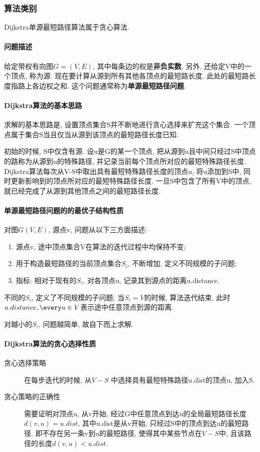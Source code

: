 \subsubsection{算法类别}
Dijkstra单源最短路径算法属于贪心算法.

\paragraph{问题描述}
给定带权有向图$G=(V,E)$, 其中每条边的权是\textbf{非负实数}. 另外, 还给定V中的一个顶点,
称为源. 现在要计算从源到所有其他各顶点的最短路长度.
此处的最短路长度指路上各边权之和. 这个问题通常称为\textbf{单源最短路径问题}.

\paragraph{Dijkstra算法的基本思路}
求解的基本思路是, 设置顶点集合S并不断地进行贪心选择来扩充这个集合.
一个顶点属于集合S当且仅当从源到该顶点的最短路径长度已知.\par

初始的时候, S中仅含有源. 设u是G的某一个顶点,
把从源到u且中间只经过S中顶点的路称为从源到u的特殊路径,
并记录当前每个顶点所对应的最短特殊路径长度.
Dijkstra算法每次从V-S中取出具有最短特殊路径长度的顶点u, 将u添加到S中,
同时更新影响到的顶点所对应的最短特殊路径长度. 一旦S中包含了所有V中的顶点,
就已经完成了从源到其他顶点之间的最短路径长度.

\paragraph{单源最短路径问题的的最优子结构性质}
对图$G(V, E)$, 源点v, 问题从以下三方面描述:
\begin{enumerate}
	\item 源点v, 途中顶点集合V在算法的迭代过程中均保持不变;
	\item 用于构造最短路径的当前顶点集合$S_i$, 不断增加, 定义不同规模的子问题;
	\item 指标: 相对于现有的$S_i$, 对各顶点u, 记录其到源点的距离u.distance.
\end{enumerate}

不同的$S_i$, 定义了不同规模的子问题; 当$S_i = V$的时候, 算法迭代结束,
此时$u.distance, \every u \in V$表示途中任意顶点到源的距离.\par

对越小的$S_i$, 问题越简单, 故自下而上求解.

\paragraph{Dijkstra算法的贪心选择性质}
\begin{description}
	\item[贪心选择策略] 在每步迭代的时候, 从$V-S$
		中选择具有最短特殊路径u.dist的顶点u, 加入S.
	\item[贪心策略的正确性] 需要证明对顶点u, 从v开始,
		经过G中任意顶点到达u的全局最短路径长度$d(v, u) = u.dist$,
		其中u.dist是从v开始, 只经过S中的顶点到达u的最短路径.
		即不存在另一条v到u的最短路径, 使得其中某些节点在$V-S$中,
		且该路径的长度$d(v, u)< u.dist$.
\end{description}

